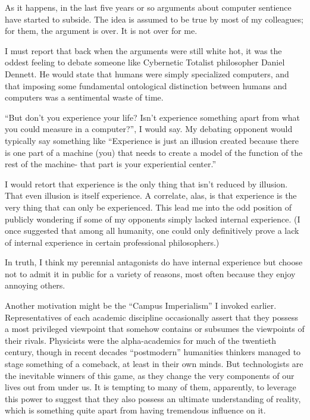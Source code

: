 \documentclass[letterpaper,12pt,english]{sphinxmanual}
\begin{document}
As it happens, in the last five years or so arguments about computer sentience have started to subside. The idea is assumed to be true by most of my colleagues; for them, the argument is over. It is not over for me.

I must report that back when the arguments were still white hot, it was the oddest feeling to debate someone like Cybernetic Totalist philosopher Daniel Dennett. He would state that humans were simply specialized computers, and that imposing some fundamental ontological distinction between humans and computers was a sentimental waste of time.

``But don't you experience your life? Isn't experience something apart from what you could measure in a computer?'', I would say. My debating opponent would typically say something like ``Experience is just an illusion created because there is one part of a machine (you) that needs to create a model of the function of the rest of the machine- that part is your experiential center.''

I would retort that experience is the only thing that isn't reduced by illusion. That even illusion is itself experience. A correlate, alas, is that experience is the very thing that can only be experienced. This lead me into the odd position of publicly wondering if some of my opponents simply lacked internal experience. (I once suggested that among all humanity, one could only definitively prove a lack of internal experience in certain professional philosophers.)

In truth, I think my perennial antagonists do have internal experience but choose not to admit it in public for a variety of reasons, most often because they enjoy annoying others.

Another motivation might be the ``Campus Imperialism'' I invoked earlier. Representatives of each academic discipline occasionally assert that they possess a most privileged viewpoint that somehow contains or subsumes the viewpoints of their rivals. Physicists were the alpha-academics for much of the twentieth century, though in recent decades ``postmodern'' humanities thinkers managed to stage something of a comeback, at least in their own minds. But technologists are the inevitable winners of this game, as they change the very components of our lives out from under us. It is tempting to many of them, apparently, to leverage this power to suggest that they also possess an ultimate understanding of reality, which is something quite apart from having tremendous influence on it.
\end{document}
